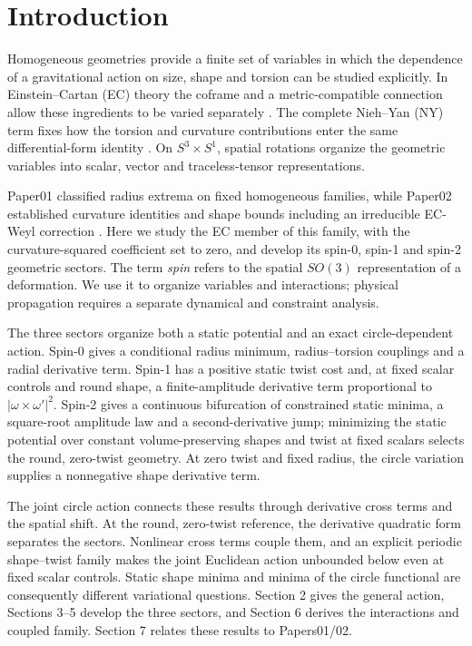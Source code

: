 \section{Introduction}

\label{sec:1}

Homogeneous geometries provide a finite set of variables in which the dependence of a gravitational action on size, shape and torsion can be studied explicitly. In Einstein--Cartan (EC) theory the coframe and a metric-compatible connection allow these ingredients to be varied separately \cite{Hehl1976}. The complete Nieh--Yan (NY) term fixes how the torsion and curvature contributions enter the same differential-form identity \cite{NiehYan1982}. On $S^3\times S^1$, spatial rotations organize the geometric variables into scalar, vector and traceless-tensor representations.

Paper01 classified radius extrema on fixed homogeneous families, while Paper02 established curvature identities and shape bounds including an irreducible EC-Weyl correction \cite{paper1,paper2}. Here we study the EC member of this family, with the curvature-squared coefficient set to zero, and develop its spin-0, spin-1 and spin-2 geometric sectors. The term \emph{spin} refers to the spatial $SO(3)$ representation of a deformation. We use it to organize variables and interactions; physical propagation requires a separate dynamical and constraint analysis.

The three sectors organize both a static potential and an exact circle-dependent action. Spin-0 gives a conditional radius minimum, radius--torsion couplings and a radial derivative term. Spin-1 has a positive static twist cost and, at fixed scalar controls and round shape, a finite-amplitude derivative term proportional to $|\omega\times\omega'|^2$. Spin-2 gives a continuous bifurcation of constrained static minima, a square-root amplitude law and a second-derivative jump; minimizing the static potential over constant volume-preserving shapes and twist at fixed scalars selects the round, zero-twist geometry. At zero twist and fixed radius, the circle variation supplies a nonnegative shape derivative term.

The joint circle action connects these results through derivative cross terms and the spatial shift. At the round, zero-twist reference, the derivative quadratic form separates the sectors. Nonlinear cross terms couple them, and an explicit periodic shape--twist family makes the joint Euclidean action unbounded below even at fixed scalar controls. Static shape minima and minima of the circle functional are consequently different variational questions. Section 2 gives the general action, Sections 3--5 develop the three sectors, and Section 6 derives the interactions and coupled family. Section 7 relates these results to Papers01/02.
